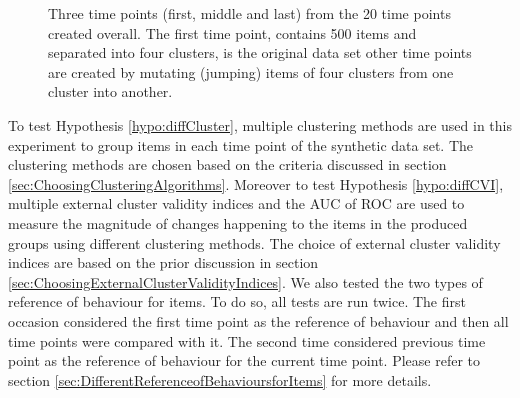 \begin{figure}[!h]
\centering
{
    }
\caption{Three time points (first, middle and last) from the 20 time points created overall. The first time point, contains 500 items and separated into four clusters, is the original data set other time points are created by mutating (jumping) items of four clusters from one cluster into another.}
\label{fig:synthesisData2}
\end{figure}
         
To test Hypothesis \ref{hypo:diffCluster}, multiple clustering methods are used in this experiment to group items in each time point of the synthetic data set. The clustering methods are chosen based on the criteria discussed in section \ref{sec:ChoosingClusteringAlgorithms}. Moreover to test Hypothesis \ref{hypo:diffCVI}, multiple external cluster validity indices and the AUC of ROC are used to measure the magnitude of changes happening to the items in the produced groups using different clustering methods. The choice of external cluster validity indices are based on the prior discussion in section \ref {sec:ChoosingExternalClusterValidityIndices}. We also tested the two types of reference of behaviour for items. To do so, all tests are run twice. The first occasion considered the first time point as the reference of behaviour and then all time points were compared with it. The second time considered previous time point as the reference of behaviour for the current time point. Please refer to section \ref{sec:DifferentReferenceofBehavioursforItems} for more details.

